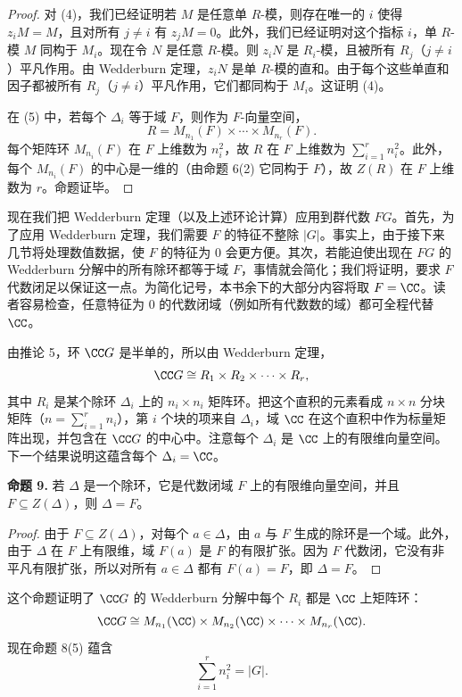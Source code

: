 \begin{proof}
对 (4)，我们已经证明若 $M$ 是任意单 $R$-模，则存在唯一的 $i$ 使得 $z_iM=M$，且对所有 $j\neq i$ 有 $z_jM=0$。此外，我们已经证明对这个指标 $i$，单 $R$-模 $M$ 同构于 $M_i$。现在令 $N$ 是任意 $R$-模。则 $z_iN$ 是 $R_i$-模，且被所有 $R_j$（$j\neq i$）平凡作用。由 Wedderburn 定理，$z_iN$ 是单 $R$-模的直和。由于每个这些单直和因子都被所有 $R_j$（$j\neq i$）平凡作用，它们都同构于 $M_i$。这证明 (4)。

在 (5) 中，若每个 $\Delta_i$ 等于域 $F$，则作为 $F$-向量空间，
\[
  R=M_{n_1}(F)\times\cdots\times M_{n_r}(F).
\]
每个矩阵环 $M_{n_i}(F)$ 在 $F$ 上维数为 $n_i^2$，故 $R$ 在 $F$ 上维数为 $\sum_{i=1}^r n_i^2$。此外，每个 $M_{n_i}(F)$ 的中心是一维的（由命题 6(2) 它同构于 $F$），故 $Z(R)$ 在 $F$ 上维数为 $r$。命题证毕。
\end{proof}

现在我们把 Wedderburn 定理（以及上述环论计算）应用到群代数 $FG$。首先，为了应用 Wedderburn 定理，我们需要 $F$ 的特征不整除 $|G|$。事实上，由于接下来几节将处理数值数据，使 $F$ 的特征为 $0$ 会更方便。其次，若能迫使出现在 $FG$ 的 Wedderburn 分解中的所有除环都等于域 $F$，事情就会简化；我们将证明，要求 $F$ 代数闭足以保证这一点。为简化记号，本书余下的大部分内容将取 $F=\CC$。读者容易检查，任意特征为 $0$ 的代数闭域（例如所有代数数的域）都可全程代替 $\CC$。

由推论 5，环 $\CC G$ 是半单的，所以由 Wedderburn 定理，
\[
  \CC G\cong R_1\times R_2\times\cdots\times R_r,
\]
其中 $R_i$ 是某个除环 $\Delta_i$ 上的 $n_i\times n_i$ 矩阵环。把这个直积的元素看成 $n\times n$ 分块矩阵（$n=\sum_{i=1}^r n_i$），第 $i$ 个块的项来自 $\Delta_i$，域 $\CC$ 在这个直积中作为标量矩阵出现，并包含在 $\CC G$ 的中心中。注意每个 $\Delta_i$ 是 $\CC$ 上的有限维向量空间。下一个结果说明这蕴含每个 $\Delta_i=\CC$。

\medskip
\noindent\textbf{命题 9.} 若 $\Delta$ 是一个除环，它是代数闭域 $F$ 上的有限维向量空间，并且 $F\subseteq Z(\Delta)$，则 $\Delta=F$。

\begin{proof}
由于 $F\subseteq Z(\Delta)$，对每个 $a\in\Delta$，由 $a$ 与 $F$ 生成的除环是一个域。此外，由于 $\Delta$ 在 $F$ 上有限维，域 $F(a)$ 是 $F$ 的有限扩张。因为 $F$ 代数闭，它没有非平凡有限扩张，所以对所有 $a\in\Delta$ 都有 $F(a)=F$，即 $\Delta=F$。
\end{proof}

这个命题证明了 $\CC G$ 的 Wedderburn 分解中每个 $R_i$ 都是 $\CC$ 上矩阵环：
\[
  \CC G\cong M_{n_1}(\CC)\times M_{n_2}(\CC)\times\cdots\times M_{n_r}(\CC).
\]
现在命题 8(5) 蕴含
\[
  \sum_{i=1}^r n_i^2=|G|.
\]


